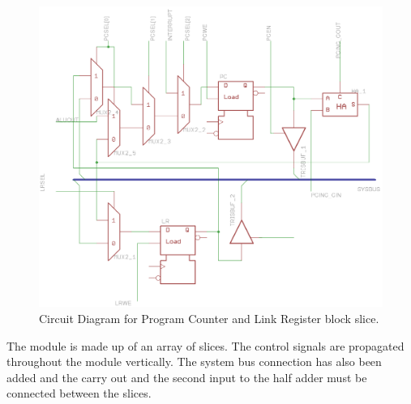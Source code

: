 \begin{figure}
\includegraphics[width=\textwidth]{../../eagle/PcBlock/PcBlock_slice.png}
\caption{Circuit Diagram for Program Counter and Link Register block slice.}
\label{fig:pc:circuit}
\end{figure}

The module is made up of an array of slices. 
The control signals are propagated throughout the module vertically. 
The system bus connection has also been added and the carry out and the second input to the half adder must be connected between the slices.
